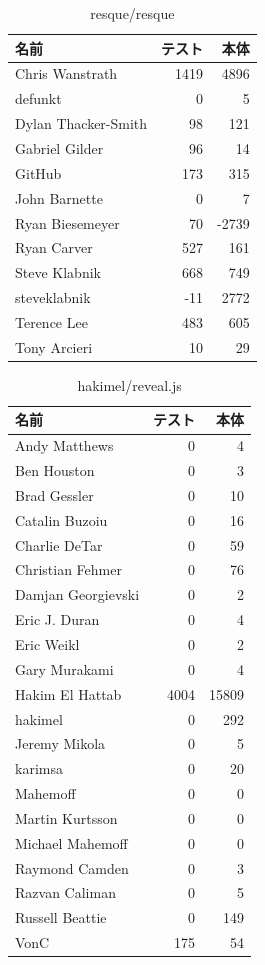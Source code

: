 \begin{table}[htb]
\begin{center}
\caption{resque/resque}
\begin{tabular}{|l|r|r|} \hline 
名前 & テスト & 本体 \\ \hline \hline
Chris Wanstrath & 1419 & 4896\\ \hline
defunkt & 0 & 5\\ \hline
Dylan Thacker-Smith & 98 & 121\\ \hline
Gabriel Gilder & 96 & 14\\ \hline
GitHub & 173 & 315\\ \hline
John Barnette & 0 & 7\\ \hline
Ryan Biesemeyer & 70 & -2739\\ \hline
Ryan Carver & 527 & 161\\ \hline
Steve Klabnik & 668 & 749\\ \hline
steveklabnik & -11 & 2772\\ \hline
Terence Lee & 483 & 605\\ \hline
Tony Arcieri & 10 & 29\\ \hline
\end{tabular}
\end{center}
\end{table}

\begin{table}[htb]
\begin{center}
\caption{hakimel/reveal.js}
\begin{tabular}{|l|r|r|} \hline 
名前 & テスト & 本体 \\ \hline \hline
Andy Matthews & 0 & 4\\ \hline
Ben Houston & 0 & 3\\ \hline
Brad Gessler & 0 & 10\\ \hline
Catalin Buzoiu & 0 & 16\\ \hline
Charlie DeTar & 0 & 59\\ \hline
Christian Fehmer & 0 & 76\\ \hline
Damjan Georgievski & 0 & 2\\ \hline
Eric J. Duran & 0 & 4\\ \hline
Eric Weikl & 0 & 2\\ \hline
Gary Murakami & 0 & 4\\ \hline
Hakim El Hattab & 4004 & 15809\\ \hline
hakimel & 0 & 292\\ \hline
Jeremy Mikola & 0 & 5\\ \hline
karimsa & 0 & 20\\ \hline
Mahemoff & 0 & 0\\ \hline
Martin Kurtsson & 0 & 0\\ \hline
Michael Mahemoff & 0 & 0\\ \hline
Raymond Camden & 0 & 3\\ \hline
Razvan Caliman & 0 & 5\\ \hline
Russell Beattie & 0 & 149\\ \hline
VonC & 175 & 54\\ \hline
\end{tabular}
\end{center}
\end{table}

